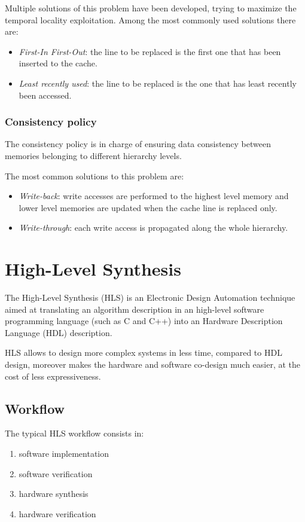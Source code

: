 \documentclass[11pt,a4paper]{memoir}
\begin{document}
Multiple solutions of this problem have been developed, trying to maximize
the temporal locality exploitation.
Among the most commonly used solutions there are:
\begin{itemize}
	\item \emph{First-In First-Out}: the line to be replaced is the first
		one that has been inserted to the cache.
	\item \emph{Least recently used}: the line to be replaced is the one
		that has least recently been accessed.
\end{itemize}

\subsubsection{Consistency policy}
The consistency policy is in charge of ensuring data consistency between memories
belonging to different hierarchy levels.

The most common solutions to this problem are:
\begin{itemize}
	\item \emph{Write-back}: write accesses are performed to the highest
		level memory and lower level memories are updated when the cache
		line is replaced only.
	\item \emph{Write-through}: each write access is propagated along the
		whole hierarchy.
\end{itemize}

\section{High-Level Synthesis}
The High-Level Synthesis (HLS) is an Electronic Design Automation technique
aimed at translating an algorithm description in an high-level software
programming language (such as C and C++) into an Hardware Description Language
(HDL) description.

HLS allows to design more complex systems in less time, compared to HDL design,
moreover makes the hardware and software co-design much easier, at the cost of
less expressiveness.

\subsection{Workflow}
The typical HLS workflow consists in:
\begin{enumerate}
	\item software implementation
	\item software verification
	\item hardware synthesis
	\item hardware verification
\end{enumerate}
\end{document}
